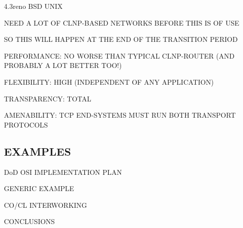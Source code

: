 \begin{bwslide}

\begin{nrtc}
\item	4.3reno BSD UNIX

\item	NEED A LOT OF CLNP-BASED NETWORKS BEFORE THIS IS OF USE

\item	SO THIS WILL HAPPEN AT THE END OF THE TRANSITION PERIOD
\end{nrtc}
\end{bwslide}


\begin{bwslide}

\begin{nrtc}
\item	PERFORMANCE: NO WORSE THAN TYPICAL CLNP-ROUTER (AND PROBABLY A LOT
	BETTER TOO!)

\item	FLEXIBILITY: HIGH (INDEPENDENT OF ANY APPLICATION)

\item	TRANSPARENCY: TOTAL

\item	AMENABILITY: TCP END-SYSTEMS MUST RUN BOTH TRANSPORT PROTOCOLS
\end{nrtc}
\end{bwslide}


\begin{bwslide}
\part	{EXAMPLES}\bf

\begin{nrtc}
\item	DoD OSI IMPLEMENTATION PLAN

\item	GENERIC EXAMPLE

\item	CO/CL INTERWORKING

\item	CONCLUSIONS
\end{nrtc}
\end{bwslide}


